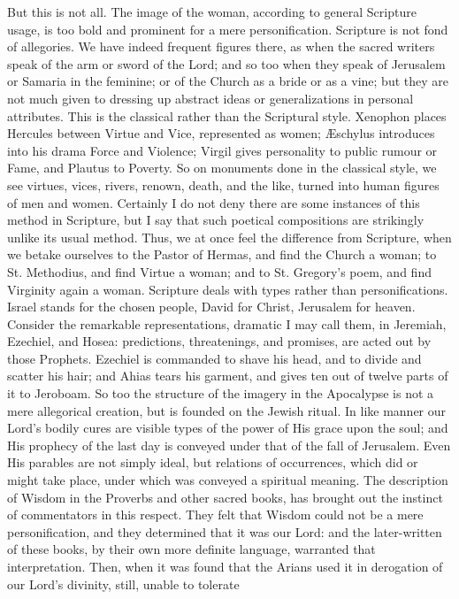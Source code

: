 But this is not all. The image of the woman, according to general
Scripture usage, is too bold and prominent for a mere personification.
Scripture is not fond of allegories. We have indeed frequent figures
there, as when the sacred writers speak of the arm or sword of the Lord;
and so too when they speak of Jerusalem or Samaria in the feminine; or
of the Church as a bride or as a vine; but they are not much given to
dressing up abstract ideas or generalizations in personal attributes.
This is the classical rather than the Scriptural style. Xenophon places
Hercules between Virtue and Vice, represented as women; Æschylus
introduces into his drama Force and Violence; Virgil gives personality
to public rumour or Fame, and Plautus to Poverty. So on monuments done
in the classical style, we see virtues, vices, rivers, renown, death,
and the like, turned into human figures of men and women. Certainly I do
not deny there are some instances of this method in Scripture, but I say
that such poetical compositions are strikingly unlike its usual method.
Thus, we at once feel the difference from Scripture, when we betake
ourselves to the Pastor of Hermas, and find the Church a woman; to St.
Methodius, and find Virtue a woman; and to St. Gregory's poem, and find
Virginity again a woman. Scripture deals with types rather than
personifications. Israel stands for the chosen people, David for Christ,
Jerusalem for heaven. Consider the remarkable representations, dramatic
I may call them, in Jeremiah, Ezechiel, and Hosea: predictions,
threatenings, and promises, are acted out by those Prophets. Ezechiel is
commanded to shave his head, and to divide and scatter his hair; and
Ahias tears his garment, and gives ten out of twelve parts of it to
Jeroboam. So too the structure of the imagery in the Apocalypse is not a
mere allegorical creation, but is founded on the Jewish ritual. In like
manner our Lord's bodily cures are visible types of the power of His
grace upon the soul; and His prophecy of the last day is conveyed under
that of the fall of Jerusalem. Even His parables are not simply ideal,
but relations of occurrences, which did or might take place, under which
was conveyed a spiritual meaning. The description of Wisdom in the
Proverbs and other sacred books, has brought out the instinct of
commentators in this respect. They felt that Wisdom could not be a mere
personification, and they determined that it was our Lord: and the
later-written of these books, by their own more definite language,
warranted that interpretation. Then, when it was found that the Arians
used it in derogation of our Lord's divinity, still, unable to tolerate
